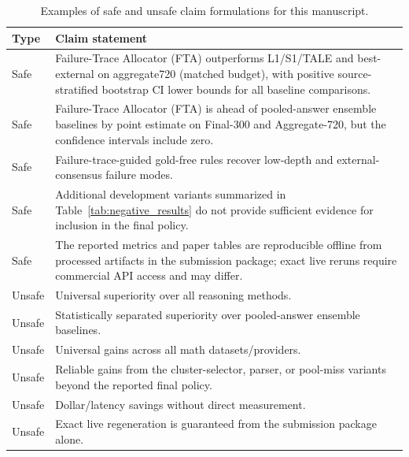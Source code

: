 \begin{table}[t]
\centering
\caption{Examples of safe and unsafe claim formulations for this manuscript.}
\label{tab:claim_language}
\small
\begin{tabular}{lp{}}
\toprule
Type & Claim statement \\
\midrule
Safe & Failure-Trace Allocator (FTA) outperforms L1/S1/TALE and best-external on aggregate720 (matched budget), with positive source-stratified bootstrap CI lower bounds for all baseline comparisons. \\
Safe & Failure-Trace Allocator (FTA) is ahead of pooled-answer ensemble baselines by point estimate on Final-300 and Aggregate-720, but the confidence intervals include zero. \\
Safe & Failure-trace-guided gold-free rules recover low-depth and external-consensus failure modes. \\
Safe & Additional development variants summarized in Table~\ref{tab:negative_results} do not provide sufficient evidence for inclusion in the final policy. \\
Safe & The reported metrics and paper tables are reproducible offline from processed artifacts in the submission package; exact live reruns require commercial API access and may differ. \\
Unsafe & Universal superiority over all reasoning methods. \\
Unsafe & Statistically separated superiority over pooled-answer ensemble baselines. \\
Unsafe & Universal gains across all math datasets/providers. \\
Unsafe & Reliable gains from the cluster-selector, parser, or pool-miss variants beyond the reported final policy. \\
Unsafe & Dollar/latency savings without direct measurement. \\
Unsafe & Exact live regeneration is guaranteed from the submission package alone. \\
\bottomrule
\end{tabular}
\end{table}
